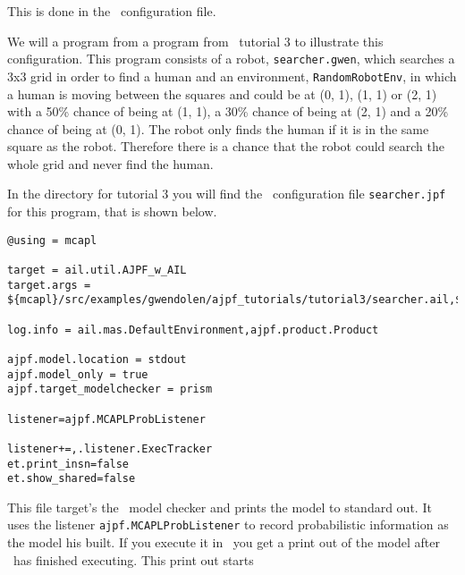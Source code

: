 \documentclass[a4]{article}
\begin{document}
This is done in the \ajpf\ configuration file.  

We will a program from a program from \ail\ tutorial 3 to illustrate this configuration. This program consists of a robot, \texttt{searcher.gwen}, which searches a 3x3 grid in order to find a human and an environment, \texttt{RandomRobotEnv}, in which a human is moving between the squares and could be at (0, 1), (1, 1) or (2, 1) with a 50\% chance of being at (1, 1), a 30\% chance of being at (2, 1) and a 20\% chance of being at (0, 1).  The robot only finds the human if it is in the same square as the robot.  Therefore there is a chance that the robot could search the whole grid and never find the human.

In the directory for tutorial 3 you will find the \ajpf\ configuration file \texttt{searcher.jpf} for this program, that is shown below.
\begin{verbatim}
@using = mcapl

target = ail.util.AJPF_w_AIL
target.args = ${mcapl}/src/examples/gwendolen/ajpf_tutorials/tutorial3/searcher.ail,${mcapl}/src/examples/gwendolen/ajpf_tutorials/tutorial3/searcher.psl,1

log.info = ail.mas.DefaultEnvironment,ajpf.product.Product

ajpf.model.location = stdout
ajpf.model_only = true
ajpf.target_modelchecker = prism

listener=ajpf.MCAPLProbListener

listener+=,.listener.ExecTracker
et.print_insn=false
et.show_shared=false
\end{verbatim}

This file target's the \prism\ model checker and prints the model to standard out.  It uses the listener \texttt{ajpf.MCAPLProbListener} to record probabilistic information as the model his built.  If you execute it in \ajpf\ you get a print out of the model after \ajpf\  has finished executing.  This print out starts
\end{document}
